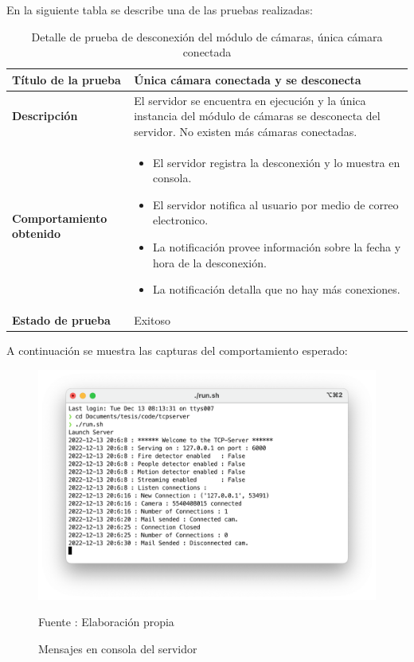 En la siguiente tabla se describe una de las pruebas realizadas:\\

\begin{table}[H]
    \caption{Detalle de prueba de desconexión del módulo de cámaras, única cámara conectada}
    \begin{center}
        \begin{tabular}{|>{\centering}p{}|m{}<{\centering}|} 
            \hline
            \textbf{Título de la prueba} & Única cámara conectada y se desconecta \\
            \hline
            \textbf{Descripción} & El servidor se encuentra en ejecución y la única instancia del módulo de cámaras se desconecta del servidor. No existen más cámaras conectadas.\\
            \hline
            \textbf{Comportamiento obtenido} & 
            \begin{itemize}
                \item El servidor registra la desconexión y lo muestra en consola.
                \item El servidor notifica al usuario por medio de correo electronico.
                \item La notificación provee información sobre la fecha y hora de la desconexión.
                \item La notificación detalla que no hay más conexiones.
            \end{itemize} \\ 
            \hline
            \textbf{Estado de prueba} & Exitoso \\
            \hline
        \end{tabular}
    \end{center}
\end{table}
A continuación se muestra las capturas del comportamiento esperado:\\
\begin{figure}[H]
    \begin{center}
        \includegraphics[width=12cm]{img/capitulo_6/cam_disconnected_1_cam.png}
    \end{center}
    \begin{center}
        \caption{Mensajes en consola del servidor}
        Fuente : Elaboración propia
    \end{center}
\end{figure}

